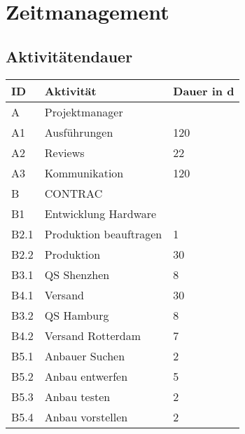 \section{Zeitmanagement}
\subsection{Aktivitätendauer}
\begin{table}[H]
    \renewcommand{\arraystretch}{1.1}
    \begin{center}
        \begin{tabular}{l|l|l}
            \hline
                        \textbf{ID} & \textbf{Aktivität} & \textbf{Dauer in d}\\\hline
            A    & \multicolumn{2}{l}{Projektmanager}\\ \hline
            A1   & Ausführungen                                        &120\\\hline
            A2   & Reviews                                             &22\\ \hline
            A3	 & Kommunikation									&120\\ \hline
            B    & \multicolumn{2}{l}{CONTRAC}\\ \hline
            B1   & Entwicklung Hardware &\\ \hline
            B2.1 & Produktion beauftragen                              &1\\ \hline
            B2.2 & Produktion                                          &30\\ \hline
            B3.1 & QS Shenzhen                                         &8\\ \hline
            B4.1 & Versand                                             &30\\ \hline
            B3.2 & QS Hamburg                                          &8\\ \hline
            B4.2 & Versand Rotterdam                                   &7\\ \hline
            B5.1 & Anbauer Suchen                                      &2\\ \hline
            B5.2 & Anbau entwerfen                                     &5\\ \hline
            B5.3 & Anbau testen                                        &2\\ \hline
            B5.4 & Anbau vorstellen                                    &2\\ \hline

\end{tabular}
\end{center}
\end{table}
